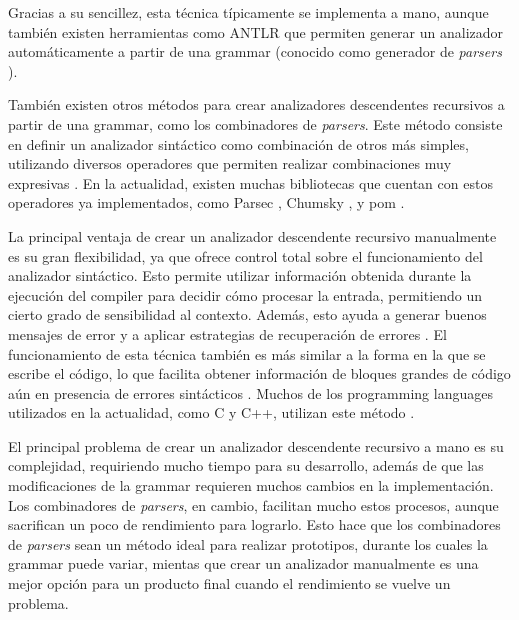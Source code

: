Gracias a su sencillez, esta técnica típicamente se implementa a mano, aunque
también existen herramientas como ANTLR \parencite{ANTLR} que permiten generar
un analizador automáticamente a partir de una \gls{grammar} (conocido como
generador de \textit{\glspl{parser}} \parencite{dragon-book}).

También existen otros métodos para crear analizadores descendentes recursivos a
partir de una \gls{grammar}, como los combinadores de \textit{\glspl{parser}}.
Este método consiste en definir un analizador sintáctico como combinación de
otros más simples, utilizando diversos operadores que permiten realizar
combinaciones muy expresivas \parencite{parser-combinators}. En la actualidad,
existen muchas bibliotecas que cuentan con estos operadores ya implementados,
como Parsec \parencite{parsec}, Chumsky \parencite{chumsky}, y pom
\parencite{pom}.

La principal ventaja de crear un analizador descendente recursivo manualmente es
su gran flexibilidad, ya que ofrece control total sobre el funcionamiento del
analizador sintáctico. Esto permite utilizar información obtenida durante la
ejecución del \gls{compiler} para decidir cómo procesar la entrada, permitiendo
un cierto grado de sensibilidad al contexto. Además, esto ayuda a generar buenos
mensajes de error y a aplicar estrategias de recuperación de errores
\parencite{errors-clang}. El funcionamiento de esta técnica también es más
similar a la forma en la que se escribe el código, lo que facilita obtener
información de bloques grandes de código aún en presencia de errores sintácticos
\parencite{resilient-LL-parsing}. Muchos de los \glspl{programming language}
utilizados en la actualidad, como C y C++, utilizan este método
\parencite{parser-types-survey}.

El principal problema de crear un analizador descendente recursivo a mano es su
complejidad, requiriendo mucho tiempo para su desarrollo, además de que las
modificaciones de la \gls{grammar} requieren muchos cambios en la
implementación. Los combinadores de \textit{\glspl{parser}}, en cambio,
facilitan mucho estos procesos, aunque sacrifican un poco de rendimiento para
lograrlo. Esto hace que los combinadores de \textit{\glspl{parser}} sean un
método ideal para realizar prototipos, durante los cuales la \gls{grammar} puede
variar, mientas que crear un analizador manualmente es una mejor opción para un
producto final cuando el rendimiento se vuelve un problema.

